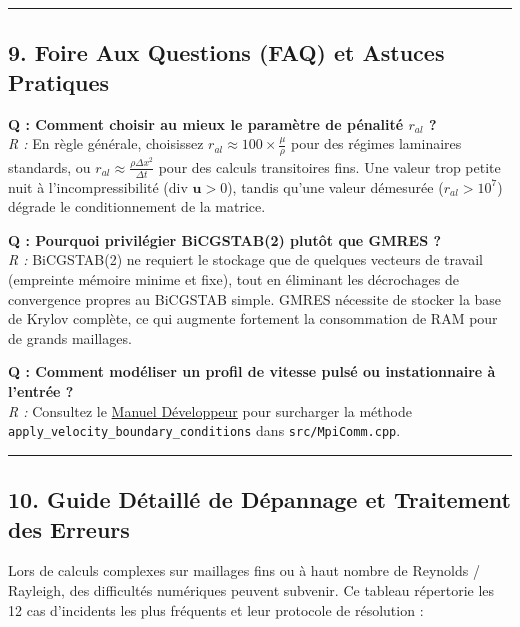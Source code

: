 \documentclass[
  french,
]{article}
\begin{document}
\begin{center}\rule{0.5\linewidth}{0.5pt}\end{center}

\subsection{9. Foire Aux Questions (FAQ) et Astuces
Pratiques}\label{foire-aux-questions-faq-et-astuces-pratiques}

\textbf{Q : Comment choisir au mieux le paramètre de pénalité \(r_{al}\)
?}\\
\emph{R :} En règle générale, choisissez
\(r_{al} \approx 100 \times \frac{\mu}{\rho}\) pour des régimes
laminaires standards, ou
\(r_{al} \approx \frac{\rho \Delta x^2}{\Delta t}\) pour des calculs
transitoires fins. Une valeur trop petite nuit à l'incompressibilité
(\(\text{div } \mathbf{u} > 0\)), tandis qu'une valeur démesurée
(\(r_{al} > 10^7\)) dégrade le conditionnement de la matrice.

\textbf{Q : Pourquoi privilégier BiCGSTAB(2) plutôt que GMRES ?}\\
\emph{R :} BiCGSTAB(2) ne requiert le stockage que de quelques vecteurs
de travail (empreinte mémoire minime et fixe), tout en éliminant les
décrochages de convergence propres au BiCGSTAB simple. GMRES nécessite
de stocker la base de Krylov complète, ce qui augmente fortement la
consommation de RAM pour de grands maillages.

\textbf{Q : Comment modéliser un profil de vitesse pulsé ou
instationnaire à l'entrée ?}\\
\emph{R :} Consultez le
\href{file:///Users/elhadjiibrahimathiam/Documents/PROJET_ANTIGRAVITY/COVOF_2D-C++/docs/DEVELOPER_GUIDE.md}{Manuel
Développeur} pour surcharger la méthode
\texttt{apply\_velocity\_boundary\_conditions} dans
\texttt{src/MpiComm.cpp}.

\begin{center}\rule{0.5\linewidth}{0.5pt}\end{center}

\subsection{10. Guide Détaillé de Dépannage et Traitement des
Erreurs}\label{guide-duxe9tailluxe9-de-duxe9pannage-et-traitement-des-erreurs}

Lors de calculs complexes sur maillages fins ou à haut nombre de
Reynolds / Rayleigh, des difficultés numériques peuvent subvenir. Ce
tableau répertorie les 12 cas d'incidents les plus fréquents et leur
protocole de résolution :
\end{document}
